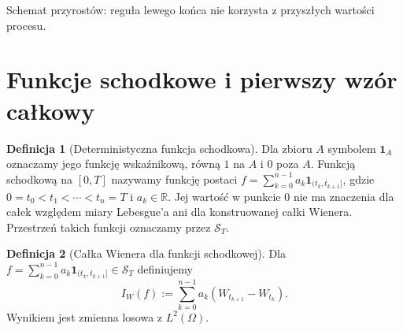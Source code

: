 \documentclass[11pt,a4paper,oneside]{report}
\numberwithin{equation}{chapter}
\theoremstyle{plain}
\theoremstyle{definition}
\newtheorem{definicja}{Definicja}[chapter]
\theoremstyle{remark}
\newcommand{\R}{\mathbb{R}}
\newcommand{\calS}{\mathcal{S}}
\newcommand{\ind}[1]{\mathbf{1}_{#1}}
\begin{document}
\begin{center}
\par\smallskip\small Schemat przyrostów: reguła lewego końca nie korzysta z przyszłych wartości procesu.
\end{center}

\section{Funkcje schodkowe i pierwszy wzór całkowy}\label{sec:volIII:01:02}
\begin{definicja}[Deterministyczna funkcja schodkowa]\label{def:volIII:01:01}
Dla zbioru $A$ symbolem $\ind{A}$ oznaczamy jego funkcję
wskaźnikową, równą $1$ na $A$ i $0$ poza $A$.
Funkcją schodkową na $[0,T]$ nazywamy funkcję postaci
$f=\sum_{k=0}^{n-1}a_k\ind{(t_k,t_{k+1}]}$, gdzie
$0=t_0<t_1<\cdots<t_n=T$ i $a_k\in\R$.
Jej wartość w punkcie $0$ nie ma znaczenia dla całek względem
miary Lebesgue'a ani dla konstruowanej całki Wienera.
Przestrzeń takich funkcji oznaczamy przez $\calS_T$.
\end{definicja}

\begin{definicja}[Całka Wienera dla funkcji schodkowej]\label{def:volIII:01:02}
Dla $f=\sum_{k=0}^{n-1}a_k\ind{(t_k,t_{k+1}]}\in\calS_T$
definiujemy
\[
I_W(f):=\sum_{k=0}^{n-1}a_k(W_{t_{k+1}}-W_{t_k}).
\tag{1.1}\label{eq:wiener-simple}
\]
Wynikiem jest zmienna losowa z $L^2(\Omega)$.
\end{definicja}
\end{document}
